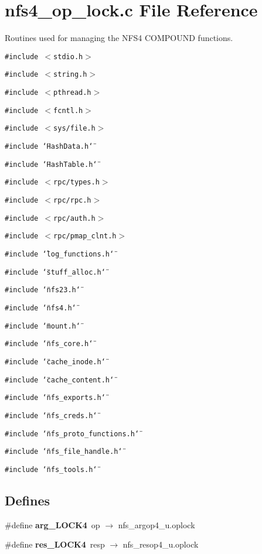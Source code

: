 \section{nfs4\_\-op\_\-lock.c File Reference}
\label{nfs4__op__lock_8c}
Routines used for managing the NFS4 COMPOUND functions. 

{\tt \#include $<$stdio.h$>$}\par
{\tt \#include $<$string.h$>$}\par
{\tt \#include $<$pthread.h$>$}\par
{\tt \#include $<$fcntl.h$>$}\par
{\tt \#include $<$sys/file.h$>$}\par
{\tt \#include \char`\"{}Hash\-Data.h\char`\"{}}\par
{\tt \#include \char`\"{}Hash\-Table.h\char`\"{}}\par
{\tt \#include $<$rpc/types.h$>$}\par
{\tt \#include $<$rpc/rpc.h$>$}\par
{\tt \#include $<$rpc/auth.h$>$}\par
{\tt \#include $<$rpc/pmap\_\-clnt.h$>$}\par
{\tt \#include \char`\"{}log\_\-functions.h\char`\"{}}\par
{\tt \#include \char`\"{}stuff\_\-alloc.h\char`\"{}}\par
{\tt \#include \char`\"{}nfs23.h\char`\"{}}\par
{\tt \#include \char`\"{}nfs4.h\char`\"{}}\par
{\tt \#include \char`\"{}mount.h\char`\"{}}\par
{\tt \#include \char`\"{}nfs\_\-core.h\char`\"{}}\par
{\tt \#include \char`\"{}cache\_\-inode.h\char`\"{}}\par
{\tt \#include \char`\"{}cache\_\-content.h\char`\"{}}\par
{\tt \#include \char`\"{}nfs\_\-exports.h\char`\"{}}\par
{\tt \#include \char`\"{}nfs\_\-creds.h\char`\"{}}\par
{\tt \#include \char`\"{}nfs\_\-proto\_\-functions.h\char`\"{}}\par
{\tt \#include \char`\"{}nfs\_\-file\_\-handle.h\char`\"{}}\par
{\tt \#include \char`\"{}nfs\_\-tools.h\char`\"{}}\par
\subsection*{Defines}
\begin{CompactItemize}
\item 
\#define {\bf arg\_\-LOCK4}\ op $\rightarrow$ nfs\_\-argop4\_\-u.oplock
\item 
\#define {\bf res\_\-LOCK4}\ resp $\rightarrow$ nfs\_\-resop4\_\-u.oplock
\end{CompactItemize}

